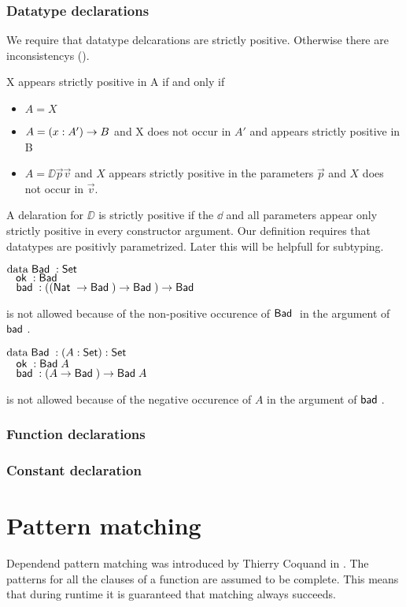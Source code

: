 \subsubsection{Datatype declarations}
We require that datatype delcarations are strictly positive.
Otherwise there are inconsistencys (\cite{paulinmohring93inductive}).
\begin{definition}
X appears strictly positive in A if and only if
\begin{itemize}
\item
$ A = X$
\item
$ A = ( x : A' ) \rightarrow B $ and X does not occur in $A'$  and appears strictly positive in B
\item
$ A = \DD \vec{p} \vec{v} $ and $X$ appears strictly positive in the parameters $\vec{p}$ 
and $X$ does not occur in $\vec{v}$.
\end{itemize}
\end{definition}
A delaration for $\DD$ is strictly positive if the $\dd$ and all parameters appear only
strictly positive in every constructor argument.
Our definition requires that datatypes are positivly parametrized.
Later this will be helpfull for subtyping.

\begin{bsp}
$\mathrm{data}\; \mathsf{Bad}\; : \mathsf{Set} $ \\
$\hspace*{3mm} \mathsf{ok}\; : \mathsf{Bad}\;$\\
$\hspace*{3mm} \mathsf{bad}\; : ((\mathsf{Nat}\; \rightarrow \mathsf{Bad}\;) \rightarrow \mathsf{Bad}\;) \rightarrow \mathsf{Bad}\;  $
\end{bsp}
is not allowed because of the non-positive occurence of $\mathsf{Bad}\;$ in the argument of $\mathsf{bad}\;$.


\begin{bsp}
$\mathrm{data}\; \mathsf{Bad}\; : ( A : \mathsf{Set} ) : \mathsf{Set} $\\
$\hspace*{3mm} \mathsf{ok}\; : \mathsf{Bad}\; A$\\
$\hspace*{3mm} \mathsf{bad}\; : (A \rightarrow \mathsf{Bad}\;) \rightarrow \mathsf{Bad}\; A$
\end{bsp}
is not allowed because of the negative occurence of $A$ in the argument of $\mathsf{bad}\;$.

\subsubsection{Function declarations}

\subsubsection{Constant declaration}

\section{Pattern matching}
Dependend pattern matching was introduced by Thierry Coquand in \cite{coquand92pattern}.
The patterns for all the clauses of a function are assumed to be complete. This means that during runtime
it is guaranteed that matching always succeeds.

